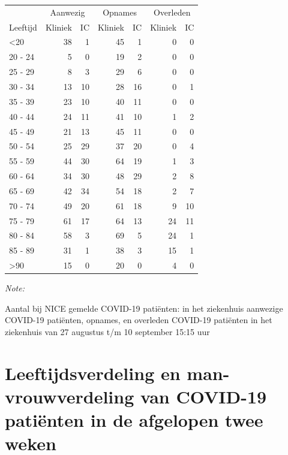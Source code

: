 \documentclass[
  english,
  man,floatsintext]{apa6}
\begin{document}
\begin{table}
\centering\begingroup\fontsize{10}{12}\selectfont

\begin{threeparttable}
\begin{tabular}{lrrrrrr}
\toprule
\multicolumn{1}{c}{ } & \multicolumn{2}{c}{Aanwezig} & \multicolumn{2}{c}{Opnames} & \multicolumn{2}{c}{Overleden} \\
\cmidrule(l{3pt}r{3pt}){2-3} \cmidrule(l{3pt}r{3pt}){4-5} \cmidrule(l{3pt}r{3pt}){6-7}
Leeftijd & Kliniek & IC & Kliniek & IC & Kliniek & IC\\
\midrule
<20 & 38 & 1 & 45 & 1 & 0 & 0\\
20 - 24 & 5 & 0 & 19 & 2 & 0 & 0\\
25 - 29 & 8 & 3 & 29 & 6 & 0 & 0\\
30 - 34 & 13 & 10 & 28 & 16 & 0 & 1\\
35 - 39 & 23 & 10 & 40 & 11 & 0 & 0\\
40 - 44 & 24 & 11 & 41 & 10 & 1 & 2\\
45 - 49 & 21 & 13 & 45 & 11 & 0 & 0\\
50 - 54 & 25 & 29 & 37 & 20 & 0 & 4\\
55 - 59 & 44 & 30 & 64 & 19 & 1 & 3\\
60 - 64 & 34 & 30 & 48 & 29 & 2 & 8\\
65 - 69 & 42 & 34 & 54 & 18 & 2 & 7\\
70 - 74 & 49 & 20 & 61 & 18 & 9 & 10\\
75 - 79 & 61 & 17 & 64 & 13 & 24 & 11\\
80 - 84 & 58 & 3 & 69 & 5 & 24 & 1\\
85 - 89 & 31 & 1 & 38 & 3 & 15 & 1\\
>90 & 15 & 0 & 20 & 0 & 4 & 0\\
\bottomrule
\end{tabular}
\begin{tablenotes}
\item \textit{Note: } 
\item Aantal bij NICE gemelde COVID-19 patiënten: in het ziekenhuis aanwezige COVID-19 patiënten, opnames, en overleden COVID-19 patiënten in het ziekenhuis van 27 augustus t/m 10 september 15:15 uur
\end{tablenotes}
\end{threeparttable}
\endgroup{}
\end{table}

\newpage

\hypertarget{leeftijdsverdeling-en-man-vrouwverdeling-van-covid-19-patiuxebnten-in-de-afgelopen-twee-weken}{%
\section{Leeftijdsverdeling en man-vrouwverdeling van COVID-19 patiënten in de afgelopen twee weken}\label{leeftijdsverdeling-en-man-vrouwverdeling-van-covid-19-patiuxebnten-in-de-afgelopen-twee-weken}}
\end{document}
